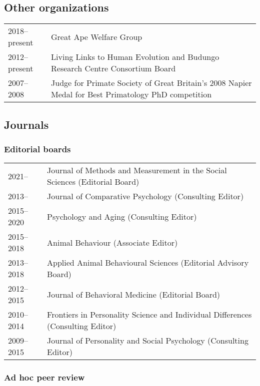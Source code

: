 \documentclass[11pt]{article}
\begin{document}
\subsection*{Other organizations}

\begin{tabular}{p{3cm}p{12cm}}
2018--present & Great Ape Welfare Group \\
2012--present & Living Links to Human Evolution and Budungo Research
Centre Consortium Board \\
2007--2008 & Judge for Primate Society of Great Britain's 2008 Napier Medal
for Best Primatology PhD competition

\end{tabular}

\subsection*{Journals}

\subsubsection*{Editorial boards}

\begin{tabular}{p{3cm}p{12cm}}
2021-- & Journal of Methods and Measurement in the Social Sciences (Editorial Board) \\
2013-- & Journal of Comparative Psychology (Consulting Editor) \\
2015--2020 & Psychology and Aging (Consulting Editor) \\
2015--2018 & Animal Behaviour (Associate Editor) \\
2013--2018 & Applied Animal Behavioural Sciences (Editorial Advisory Board) \\
2012--2015 & Journal of Behavioral Medicine (Editorial Board) \\
2010--2014 & Frontiers in Personality Science and Individual
Differences (Consulting Editor) \\
2009--2015 & Journal of Personality and Social Psychology (Consulting Editor)
\end{tabular}

\subsubsection*{Ad hoc peer review}
\end{document}
